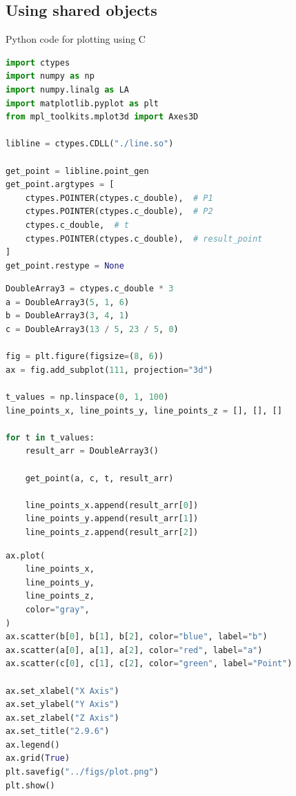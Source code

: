 \documentclass{beamer}
\theoremstyle{remark}
\numberwithin{equation}{section}
\begin{document}
\subsection{Using shared objects}
\begin{frame}[fragile]{Python code for plotting using C}
\begin{lstlisting}[language=Python]
import ctypes
import numpy as np
import numpy.linalg as LA
import matplotlib.pyplot as plt
from mpl_toolkits.mplot3d import Axes3D

libline = ctypes.CDLL("./line.so")

get_point = libline.point_gen
get_point.argtypes = [
    ctypes.POINTER(ctypes.c_double),  # P1
    ctypes.POINTER(ctypes.c_double),  # P2
    ctypes.c_double,  # t
    ctypes.POINTER(ctypes.c_double),  # result_point
]
get_point.restype = None
\end{lstlisting}
\end{frame}
\begin{frame}[fragile]
 \begin{lstlisting}[language=Python]
DoubleArray3 = ctypes.c_double * 3
a = DoubleArray3(5, 1, 6)
b = DoubleArray3(3, 4, 1)
c = DoubleArray3(13 / 5, 23 / 5, 0)

fig = plt.figure(figsize=(8, 6))
ax = fig.add_subplot(111, projection="3d")

t_values = np.linspace(0, 1, 100)
line_points_x, line_points_y, line_points_z = [], [], []

for t in t_values:
    result_arr = DoubleArray3()

    get_point(a, c, t, result_arr)

    line_points_x.append(result_arr[0])
    line_points_y.append(result_arr[1])
    line_points_z.append(result_arr[2])
 \end{lstlisting}
\end{frame}
\begin{frame}[fragile]
 \begin{lstlisting}[language=Python]
ax.plot(
    line_points_x,
    line_points_y,
    line_points_z,
    color="gray",
)
ax.scatter(b[0], b[1], b[2], color="blue", label="b")
ax.scatter(a[0], a[1], a[2], color="red", label="a")
ax.scatter(c[0], c[1], c[2], color="green", label="Point")

ax.set_xlabel("X Axis")
ax.set_ylabel("Y Axis")
ax.set_zlabel("Z Axis")
ax.set_title("2.9.6")
ax.legend()
ax.grid(True)
plt.savefig("../figs/plot.png")
plt.show()
 \end{lstlisting}
\end{frame}
\end{document}
